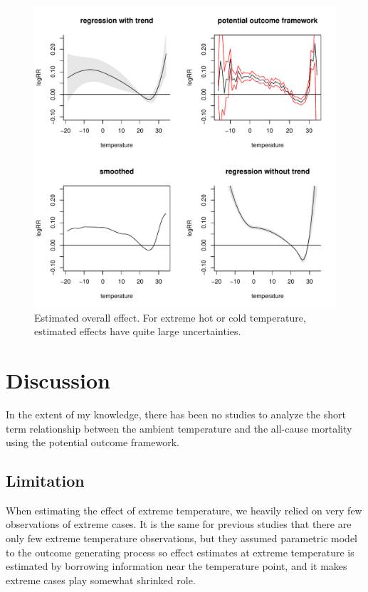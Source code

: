 \documentclass[12pt]{article}
\begin{document}
\begin{figure}
	\includegraphics[width = \textwidth]{figures/main1.pdf}
	\caption[Figure 1.]{Estimated overall effect. 
	For extreme hot or cold temperature, estimated effects have quite large uncertainties.}
\end{figure}

\section{Discussion}

In the extent of my knowledge, there has been no studies to analyze the short term relationship 
between the ambient temperature and the all-cause mortality using the potential outcome framework.

\subsection{Limitation}
When estimating the effect of extreme temperature,
we heavily relied on very few observations of extreme cases.
It is the same for previous studies that there are only few extreme temperature observations,
but they assumed parametric model to the outcome generating process
so effect estimates at extreme temperature is estimated by borrowing information near the temperature point,
and it makes extreme cases play somewhat shrinked role.
\end{document}
